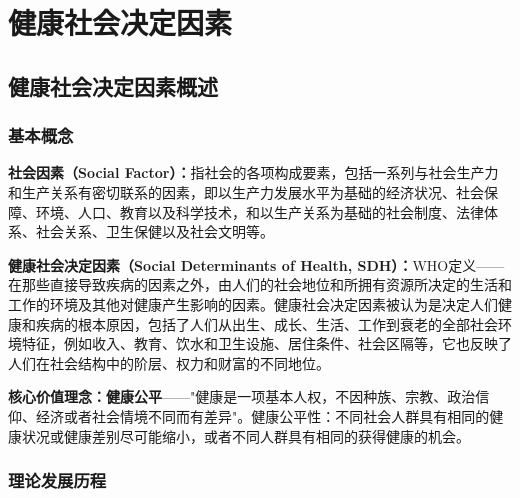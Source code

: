 \chapter{健康社会决定因素}
\setcounter{chapter}{3}

\section{健康社会决定因素概述}

\subsection{基本概念}

\begin{defbox}
\textbf{社会因素（Social Factor）：}指社会的各项构成要素，包括一系列与社会生产力和生产关系有密切联系的因素，即以生产力发展水平为基础的经济状况、社会保障、环境、人口、教育以及科学技术，和以生产关系为基础的社会制度、法律体系、社会关系、卫生保健以及社会文明等。

\textbf{健康社会决定因素（Social Determinants of Health, SDH）：}WHO定义——在那些直接导致疾病的因素之外，由人们的社会地位和所拥有资源所决定的生活和工作的环境及其他对健康产生影响的因素。健康社会决定因素被认为是决定人们健康和疾病的根本原因，包括了人们从出生、成长、生活、工作到衰老的全部社会环境特征，例如收入、教育、饮水和卫生设施、居住条件、社会区隔等，它也反映了人们在社会结构中的阶层、权力和财富的不同地位。

\textbf{核心价值理念：健康公平}——"健康是一项基本人权，不因种族、宗教、政治信仰、经济或者社会情境不同而有差异"。健康公平性：不同社会人群具有相同的健康状况或健康差别尽可能缩小，或者不同人群具有相同的获得健康的机会。
\end{defbox}

\subsection{理论发展历程}

